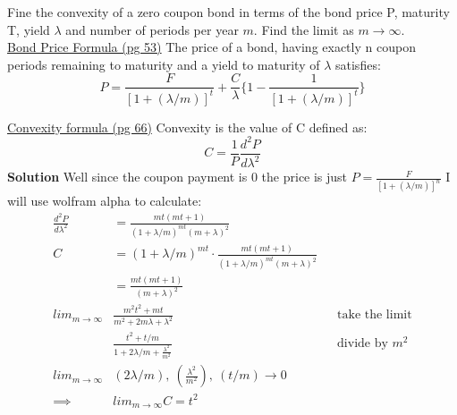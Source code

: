 \documentclass[12pt]{article}
\newenvironment{problem}[2][Problem]{\begin{trivlist}
\item[\hskip \labelsep {\bfseries #1}\hskip \labelsep {\bfseries #2.}]}{\end{trivlist}}
\begin{document}
\begin{problem}{4} Fine the convexity of a zero coupon bond in terms of the bond price P, maturity T, yield $\lambda $ and number of periods per year $m$. Find the limit as $m\rightarrow \infty $. \\
\underline{Bond Price Formula (pg 53)} The price of a bond, having exactly n coupon periods remaining to maturity and a yield to maturity of $\lambda $ satisfies: 
$$P= \frac{F}{[1+(\lambda / m)]^t} + \frac{C}{\lambda }\{ 1- \frac{1}{[1+(\lambda / m)]^t}\}$$

\underline{Convexity formula (pg 66)} Convexity is the value of C defined as: $$ C = \frac{1}{P}\frac{d^2P}{d\lambda^2}$$
\textbf{Solution} Well since the coupon payment is 0 the price is just $P= \frac{F}{[1+(\lambda / m)]^n}$ I will use wolfram alpha to calculate: 
\begin{align*}
\frac{d^2P}{d\lambda^2} &= \frac{mt(mt+1)}{(1+\lambda /m)^{mt}(m+\lambda )^2} \\ 
C &= (1+\lambda /m)^{mt} \cdot \frac{mt(mt+1)}{(1+\lambda /m)^{mt}(m+\lambda )^2} \\
&=  \frac{mt(mt+1)}{(m+\lambda )^2} \\
lim_{m\rightarrow \infty }& \frac{m^2t^2 + mt}{m^2 + 2m\lambda + \lambda^2} && \text{take the limit}\\
& \frac{t^2 + t/m}{1 + 2\lambda /m + \frac{\lambda^2}{m^2}} && \text{divide by $m^2$} \\
lim_{m\rightarrow \infty }& (2\lambda /m), \ (\frac{\lambda^2}{m^2}), \ (t/m) \rightarrow 0 \\
\implies & lim_{m\rightarrow \infty } C = t^2
\end{align*}
\end{problem}

\end{document}
